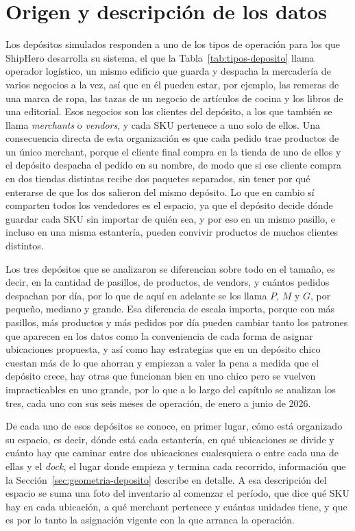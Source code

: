 \section{Origen y descripción de los datos}
\label{sec:origen-datos}


Los depósitos simulados responden a uno de los tipos de operación para los que ShipHero desarrolla su sistema, el que la Tabla~\ref{tab:tipos-deposito} llama operador logístico, un mismo edificio que guarda y despacha la mercadería de varios negocios a la vez, así que en él pueden estar, por ejemplo, las remeras de una marca de ropa, las tazas de un negocio de artículos de cocina y los libros de una editorial.
Esos negocios son los clientes del depósito, a los que también se llama \emph{merchants} o \emph{vendors}, y cada SKU pertenece a uno solo de ellos.
Una consecuencia directa de esta organización es que cada pedido trae productos de un único merchant, porque el cliente final compra en la tienda de uno de ellos y el depósito despacha el pedido en su nombre, de modo que si ese cliente compra en dos tiendas distintas recibe dos paquetes separados, sin tener por qué enterarse de que los dos salieron del mismo depósito.
Lo que en cambio sí comparten todos los vendedores es el espacio, ya que el depósito decide dónde guardar cada SKU sin importar de quién sea, y por eso en un mismo pasillo, e incluso en una misma estantería, pueden convivir productos de muchos clientes distintos.

Los tres depósitos que se analizaron se diferencian sobre todo en el tamaño, es decir, en la cantidad de pasillos, de productos, de vendors, y cuántos pedidos despachan por día, por lo que de aquí en adelante se los llama $P$, $M$ y $G$, por pequeño, mediano y grande.
Esa diferencia de escala importa, porque con más pasillos, más productos y más pedidos por día pueden cambiar tanto los patrones que aparecen en los datos como la conveniencia de cada forma de asignar ubicaciones propuesta, y así como hay estrategias que en un depósito chico cuestan más de lo que ahorran y empiezan a valer la pena a medida que el depósito crece, hay otras que funcionan bien en uno chico pero se vuelven impracticables en uno grande, por lo que a lo largo del capítulo se analizan los tres, cada uno con sus seis meses de operación, de enero a junio de 2026.

De cada uno de esos depósitos se conoce, en primer lugar, cómo está organizado su espacio, es decir, dónde está cada estantería, en qué ubicaciones se divide y cuánto hay que caminar entre dos ubicaciones cualesquiera o entre cada una de ellas y el \emph{dock}, el lugar donde empieza y termina cada recorrido, información que la Sección~\ref{sec:geometria-deposito} describe en detalle.
A esa descripción del espacio se suma una foto del inventario al comenzar el período, que dice qué SKU hay en cada ubicación, a qué merchant pertenece y cuántas unidades tiene, y que es por lo tanto la asignación vigente con la que arranca la operación.

